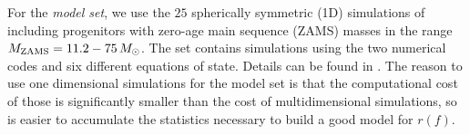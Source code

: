 {For the {\it model set}, we use the $25$ spherically symmetric (1D) simulations of \citep{Torres:2019a}
including progenitors with zero-age main sequence (ZAMS) masses in the range 
$M_{\mathrm{ZAMS}} = 11.2 - 75 \, M_{\odot}$. The set contains simulations using the
 two numerical codes and six different equations of state. Details can be found in
 \citep{Torres:2019a}. The reason to use one dimensional simulations for the model set
 is that the computational cost of those is significantly smaller than the cost of multidimensional
 simulations, so is easier to accumulate the statistics necessary to build a good model for $r(f)$.}
 
